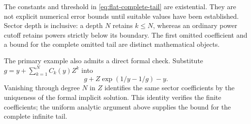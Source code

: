 The constants and threshold in \eqref{eq:flat-complete-tail} are
existential. They are not explicit numerical error bounds until suitable
values have been established. Sector depth is inclusive: a depth $N$
retains $k\le N$, whereas an ordinary power cutoff retains powers strictly
below its boundary. The first omitted coefficient and a bound for the
complete omitted tail are distinct mathematical objects.

The primary example also admits a direct formal check. Substitute
$g=y+\sum_{k=1}^N C_k(y)Z^k$ into
\[
 g+Z\exp(1/y-1/g)-y.
\]
Vanishing through degree $N$ in $Z$ identifies the same sector coefficients
by the uniqueness of the formal implicit solution. This identity verifies
the finite coefficients; the uniform analytic argument above supplies the
bound for the complete infinite tail.

